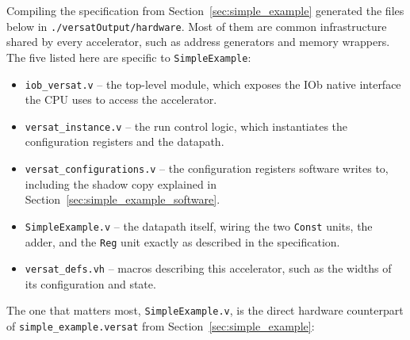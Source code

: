 %

Compiling the specification from Section~\ref{sec:simple_example} generated the files below in \texttt{./versatOutput/hardware}. Most of them are common infrastructure shared by every accelerator, such as address generators and memory wrappers. The five listed here are specific to \texttt{SimpleExample}:

\begin{itemize}
  \itemsep-0.5em
  \item \texttt{iob\_versat.v} -- the top-level module, which exposes the IOb native interface the CPU uses to access the accelerator.
  \item \texttt{versat\_instance.v} -- the run control logic, which instantiates the configuration registers and the datapath.
  \item \texttt{versat\_configurations.v} -- the configuration registers software writes to, including the shadow copy explained in Section~\ref{sec:simple_example_software}.
  \item \texttt{SimpleExample.v} -- the datapath itself, wiring the two \texttt{Const} units, the adder, and the \texttt{Reg} unit exactly as described in the specification.
  \item \texttt{versat\_defs.vh} -- macros describing this accelerator, such as the widths of its configuration and state.
\end{itemize}

The one that matters most, \texttt{SimpleExample.v}, is the direct hardware counterpart of \texttt{simple\_example.versat} from Section~\ref{sec:simple_example}:

